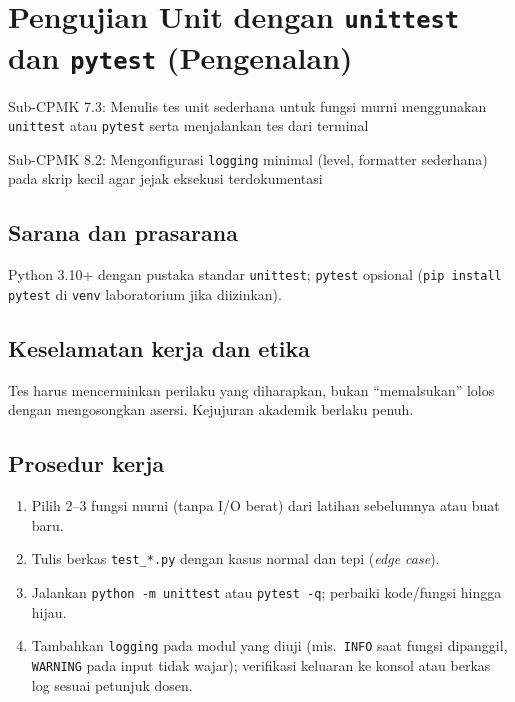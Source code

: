 \documentclass[../main.tex]{subfiles}
\begin{document}
\chapter{Pengujian Unit dengan \texttt{unittest} dan \texttt{pytest} (Pengenalan)}

\begin{subcpmk}
  \item Sub-CPMK 7.3: Menulis tes unit sederhana untuk fungsi murni menggunakan \texttt{unittest} atau \texttt{pytest} serta menjalankan tes dari terminal
  \item Sub-CPMK 8.2: Mengonfigurasi \texttt{logging} minimal (level, formatter sederhana) pada skrip kecil agar jejak eksekusi terdokumentasi
\end{subcpmk}


\section{Sarana dan prasarana}

Python 3.10+ dengan pustaka standar \texttt{unittest}; \texttt{pytest} opsional (\texttt{pip install pytest} di \texttt{venv} laboratorium jika diizinkan).

\section{Keselamatan kerja dan etika}

Tes harus mencerminkan perilaku yang diharapkan, bukan ``memalsukan'' lolos dengan mengosongkan asersi. Kejujuran akademik berlaku penuh.

\section{Prosedur kerja}

\begin{enumerate}[leftmargin=*]
  \item Pilih 2--3 fungsi murni (tanpa I/O berat) dari latihan sebelumnya atau buat baru.
  \item Tulis berkas \texttt{test\_*.py} dengan kasus normal dan tepi (\textit{edge case}).
  \item Jalankan \texttt{python -m unittest} atau \texttt{pytest -q}; perbaiki kode/fungsi hingga hijau.
  \item Tambahkan \texttt{logging} pada modul yang diuji (mis.\ \texttt{INFO} saat fungsi dipanggil, \texttt{WARNING} pada input tidak wajar); verifikasi keluaran ke konsol atau berkas log sesuai petunjuk dosen.
\end{enumerate}
\end{document}
